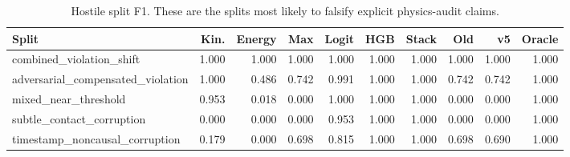 \begin{table}[t]
\centering
\caption{Hostile split F1. These are the splits most likely to falsify explicit physics-audit claims.}
\label{tab:selected-splits}
\scriptsize
\setlength{\tabcolsep}{1.8pt}
\begin{tabular}{lrrrrrrrrr}
\toprule
Split & Kin. & Energy & Max & Logit & HGB & Stack & Old & v5 & Oracle \\
\midrule
combined\_violation\_shift & 1.000 & 1.000 & 1.000 & 1.000 & 1.000 & 1.000 & 1.000 & 1.000 & 1.000 \\
adversarial\_compensated\_violation & 1.000 & 0.486 & 0.742 & 0.991 & 1.000 & 1.000 & 0.742 & 0.742 & 1.000 \\
mixed\_near\_threshold & 0.953 & 0.018 & 0.000 & 1.000 & 1.000 & 1.000 & 0.000 & 0.000 & 1.000 \\
subtle\_contact\_corruption & 0.000 & 0.000 & 0.000 & 0.953 & 1.000 & 1.000 & 0.000 & 0.000 & 1.000 \\
timestamp\_noncausal\_corruption & 0.179 & 0.000 & 0.698 & 0.815 & 1.000 & 1.000 & 0.698 & 0.690 & 1.000 \\
\bottomrule
\end{tabular}
\end{table}
